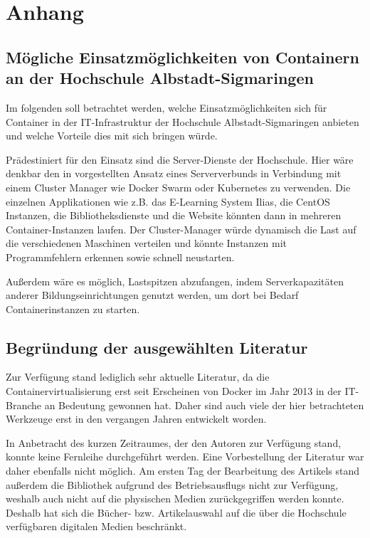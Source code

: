 \section{Anhang}
\label{sec:anhang}

\subsection{Mögliche Einsatzmöglichkeiten von Containern an der Hochschule Albstadt-Sigmaringen}
\label{app:EinsatzHSAlbSig}

Im folgenden soll betrachtet werden, welche Einsatzmöglichkeiten sich für Container in der IT-Infrastruktur der Hochschule Albstadt-Sigmaringen anbieten und welche Vorteile dies mit sich bringen würde. 

Prädestiniert für den Einsatz sind die Server-Dienste der Hochschule.
Hier wäre denkbar den in  vorgestellten Ansatz eines Serververbunds in Verbindung mit einem Cluster Manager wie Docker Swarm oder Kubernetes zu verwenden.
Die einzelnen Applikationen wie z.B. das E-Learning System Ilias, die CentOS Instanzen, die Bibliotheksdienste und die Website könnten dann in mehreren Container-Instanzen laufen.
Der Cluster-Manager würde dynamisch die Last auf die verschiedenen Maschinen verteilen und könnte Instanzen mit Programmfehlern erkennen sowie schnell neustarten.

Außerdem wäre es möglich, Lastspitzen abzufangen, indem Serverkapazitäten anderer Bildungseinrichtungen genutzt werden, um dort bei Bedarf Containerinstanzen zu starten.

\subsection{Begründung der ausgewählten Literatur}
\label{app:BegruendungLiteratur}
Zur Verfügung stand lediglich sehr aktuelle Literatur, da die Containervirtualisierung erst seit Erscheinen von Docker im Jahr 2013 in der IT-Branche an Bedeutung gewonnen hat. Daher sind auch viele der hier betrachteten Werkzeuge erst in den vergangen Jahren entwickelt worden.

In  Anbetracht des kurzen Zeitraumes, der den Autoren zur Verfügung stand, konnte keine Fernleihe durchgeführt werden.
Eine Vorbestellung der Literatur war daher ebenfalls nicht möglich.
Am ersten Tag der Bearbeitung des Artikels stand außerdem die Bibliothek aufgrund des Betriebsausflugs nicht zur Verfügung, weshalb auch nicht auf die physischen Medien zurückgegriffen werden konnte.
Deshalb hat sich die Bücher- bzw. Artikelauswahl auf die über die Hochschule verfügbaren digitalen Medien beschränkt.


